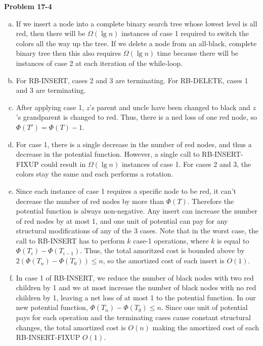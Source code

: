 \documentclass{article}
\begin{document}
\noindent\textbf{Problem 17-4}\\
\begin{enumerate}[a.]
\item If we insert a node into a complete binary search tree whose lowest level is all red, then there will be $\Omega(\lg n)$ instances of case 1 required to switch the colors all the way up the tree.  If we delete a node from an all-black, complete binary tree then this also requires $\Omega(\lg n)$ time because there will be instances of case 2 at each iteration of the while-loop. \\

\item For RB-INSERT, cases 2 and 3 are terminating.  For RB-DELETE, cases 1 and 3 are terminating. \\

\item After applying case 1, $z$'s parent and uncle have been changed to black and $z$'s grandparent is changed to red.  Thus, there is a ned loss of one red node, so $\Phi(T') = \Phi(T) - 1$.\\

\item For case 1, there is a single decrease in the number of red nodes, and thus a decrease in the potential function.  However, a single call to RB-INSERT-FIXUP could result in $\Omega(\lg n)$ instances of case 1.  For cases 2 and 3, the colors stay the same and each performs a rotation.\\

\item Since each instance of case 1 requires a specific node to be red, it can't decrease the number of red nodes by more than $\Phi(T)$.  Therefore the potential function is always non-negative. Any insert can increase the number of red nodes by at most 1, and one unit of potential can pay for any structural modifications of any of the 3 cases.  Note that in the worst case, the call to RB-INSERT has to perform $k$ case-1 operations, where $k$ is equal to $\Phi(T_i) - \Phi(T_{i-1})$. Thus, the total amoritzed cost is bounded above by $2(\Phi(T_n) - \Phi(T_0)) \leq n$, so the amortized cost of each insert is $O(1)$. \\

\item In case 1 of RB-INSERT, we reduce the number of black nodes with two red children by 1 and we at most increase the number of black nodes with no red children by 1, leaving a net loss of at most 1 to the potential function. In our new potential function, $\Phi(T_n) - \Phi(T_0) \leq n$.  Since one unit of potential pays for each operation and the terminating cases cause constant structural changes, the total amortized cost is $O(n)$ making the amortized cost of each RB-INSERT-FIXUP $O(1)$. \\


\end{enumerate}
\end{document}
